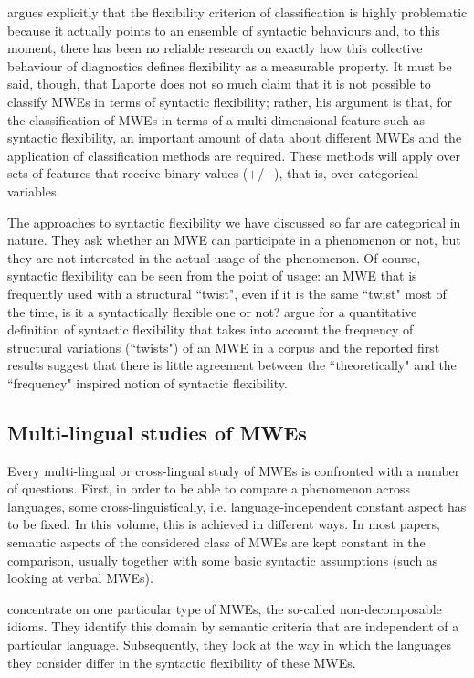 \documentclass[output=paper]{langsci/langscibook}
\begin{document}
\newpage 
{} argues explicitly that the flexibility criterion of classification is highly problematic because it actually points to an ensemble of syntactic behaviours and, to this moment, there has been no reliable research on exactly how this collective behaviour of diagnostics defines  flexibility as a measurable property. It must be said, though, that Laporte does not so much claim that it is not possible to classify MWEs in terms of syntactic flexibility; rather, his argument is that, for the classification of MWEs in terms of a multi-dimensional feature such as syntactic flexibility, an important amount of data about different MWEs and the application of classification methods are required. These methods will apply over sets of features that receive binary values ($+$/$-$), that is, over categorical variables. 

The approaches to syntactic flexibility we have discussed so far are categorical in nature. They ask whether an MWE can participate in a phenomenon or not, but they are not interested in the actual usage of the phenomenon. Of course, syntactic flexibility can be seen from the point of usage: an MWE that is frequently used with a structural ``twist", even if it is the same ``twist" most of the time, is it a syntactically flexible one or not? 
argue for a quantitative definition of syntactic flexibility that takes into account the frequency of structural variations (``twists") of an MWE in a corpus and the reported first results suggest that there is little agreement between the ``theoretically" and the ``frequency" inspired notion of syntactic flexibility. 


\subsection{Multi-lingual studies of MWEs}
\label{Sec-Multiling}
\largerpage[-1]
Every multi-lingual or cross-lingual study of MWEs is confronted with a number of questions. First, in order to be able to compare a phenomenon across languages, some cross-linguistically, i.e. language-independent constant aspect has to be fixed. In this volume, this is achieved in different ways. In most papers, semantic aspects of the considered class of MWEs are kept constant in the comparison, usually together with some basic syntactic assumptions (such as looking at verbal MWEs).  

concentrate on one particular type of MWEs, the so-called non-de\-com\-posable idioms. 
They identify this domain by semantic criteria that are independent of a particular language. 
Subsequently, they look at the way in which the languages they consider differ in the  syntactic flexibility of these MWEs.
\end{document}
